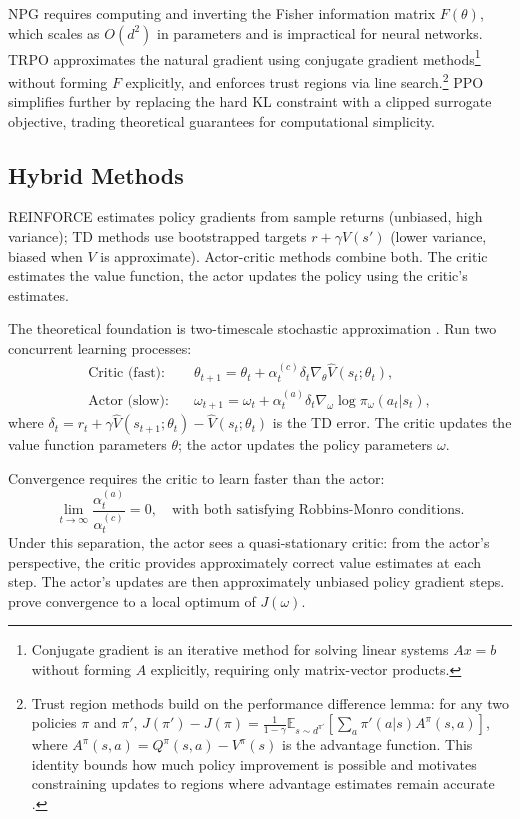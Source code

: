 NPG requires computing and inverting the Fisher information matrix $F(\theta)$, which scales as $O(d^2)$ in parameters and is impractical for neural networks. TRPO \citep{Schulman2015} approximates the natural gradient using conjugate gradient methods\footnote{Conjugate gradient is an iterative method for solving linear systems $Ax = b$ without forming $A$ explicitly, requiring only matrix-vector products.} without forming $F$ explicitly, and enforces trust regions via line search.\footnote{Trust region methods build on the performance difference lemma: for any two policies $\pi$ and $\pi'$, $J(\pi') - J(\pi) = \frac{1}{1-\gamma} \mathbb{E}_{s \sim d^{\pi'}} [ \sum_a \pi'(a|s) A^\pi(s,a) ]$, where $A^\pi(s,a) = Q^\pi(s,a) - V^\pi(s)$ is the advantage function. This identity bounds how much policy improvement is possible and motivates constraining updates to regions where advantage estimates remain accurate \citep{Kakade2002}.} PPO \citep{Schulman2017} simplifies further by replacing the hard KL constraint with a clipped surrogate objective, trading theoretical guarantees for computational simplicity.


\subsection{Hybrid Methods}
\label{sec:actor_critic}

REINFORCE estimates policy gradients from sample returns (unbiased, high variance); TD methods use bootstrapped targets $r + \gamma V(s')$ (lower variance, biased when $V$ is approximate). Actor-critic methods combine both. The critic estimates the value function, the actor updates the policy using the critic's estimates.

The theoretical foundation is two-timescale stochastic approximation \citep{konda2000}. Run two concurrent learning processes:
\begin{align}
\text{Critic (fast):} \quad & \theta_{t+1} = \theta_t + \alpha_t^{(c)} \delta_t \nabla_\theta \hat{V}(s_t; \theta_t), \\
\text{Actor (slow):} \quad & \omega_{t+1} = \omega_t + \alpha_t^{(a)} \delta_t \nabla_\omega \log \pi_\omega(a_t|s_t),
\end{align}
where $\delta_t = r_t + \gamma \hat{V}(s_{t+1}; \theta_t) - \hat{V}(s_t; \theta_t)$ is the TD error. The critic updates the value function parameters $\theta$; the actor updates the policy parameters $\omega$.

Convergence requires the critic to learn faster than the actor:
\begin{equation}
\lim_{t \to \infty} \frac{\alpha_t^{(a)}}{\alpha_t^{(c)}} = 0, \quad \text{with both satisfying Robbins-Monro conditions.}
\end{equation}
Under this separation, the actor sees a quasi-stationary critic: from the actor's perspective, the critic provides approximately correct value estimates at each step. The actor's updates are then approximately unbiased policy gradient steps. \citet{konda2000} prove convergence to a local optimum of $J(\omega)$.

